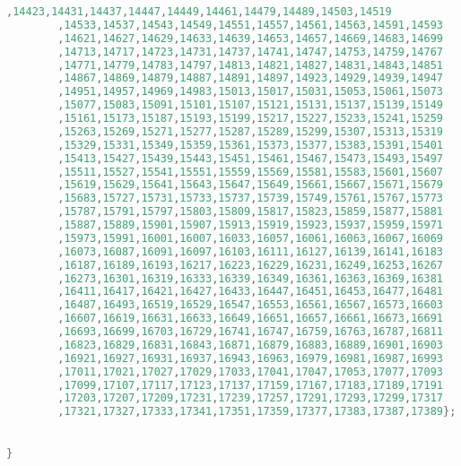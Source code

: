 \begin{solution}
\begin{lstlisting}[language=Java, caption="Java"]
		,14423,14431,14437,14447,14449,14461,14479,14489,14503,14519 
		,14533,14537,14543,14549,14551,14557,14561,14563,14591,14593 
		,14621,14627,14629,14633,14639,14653,14657,14669,14683,14699 
		,14713,14717,14723,14731,14737,14741,14747,14753,14759,14767 
		,14771,14779,14783,14797,14813,14821,14827,14831,14843,14851 
		,14867,14869,14879,14887,14891,14897,14923,14929,14939,14947 
		,14951,14957,14969,14983,15013,15017,15031,15053,15061,15073 
		,15077,15083,15091,15101,15107,15121,15131,15137,15139,15149 
		,15161,15173,15187,15193,15199,15217,15227,15233,15241,15259 
		,15263,15269,15271,15277,15287,15289,15299,15307,15313,15319 
		,15329,15331,15349,15359,15361,15373,15377,15383,15391,15401 
		,15413,15427,15439,15443,15451,15461,15467,15473,15493,15497 
		,15511,15527,15541,15551,15559,15569,15581,15583,15601,15607 
		,15619,15629,15641,15643,15647,15649,15661,15667,15671,15679 
		,15683,15727,15731,15733,15737,15739,15749,15761,15767,15773 
		,15787,15791,15797,15803,15809,15817,15823,15859,15877,15881 
		,15887,15889,15901,15907,15913,15919,15923,15937,15959,15971 
		,15973,15991,16001,16007,16033,16057,16061,16063,16067,16069 
		,16073,16087,16091,16097,16103,16111,16127,16139,16141,16183 
		,16187,16189,16193,16217,16223,16229,16231,16249,16253,16267 
		,16273,16301,16319,16333,16339,16349,16361,16363,16369,16381 
		,16411,16417,16421,16427,16433,16447,16451,16453,16477,16481 
		,16487,16493,16519,16529,16547,16553,16561,16567,16573,16603 
		,16607,16619,16631,16633,16649,16651,16657,16661,16673,16691 
		,16693,16699,16703,16729,16741,16747,16759,16763,16787,16811 
		,16823,16829,16831,16843,16871,16879,16883,16889,16901,16903 
		,16921,16927,16931,16937,16943,16963,16979,16981,16987,16993 
		,17011,17021,17027,17029,17033,17041,17047,17053,17077,17093 
		,17099,17107,17117,17123,17137,17159,17167,17183,17189,17191 
		,17203,17207,17209,17231,17239,17257,17291,17293,17299,17317 
		,17321,17327,17333,17341,17351,17359,17377,17383,17387,17389};
	

}

		\end{lstlisting}  

\end{solution}	


\begin{problem}

\end{problem}	

\begin{solution}

		\begin{lstlisting}[language=Haskell, caption="Haskell"]
        

		\end{lstlisting}  

\end{solution}	


